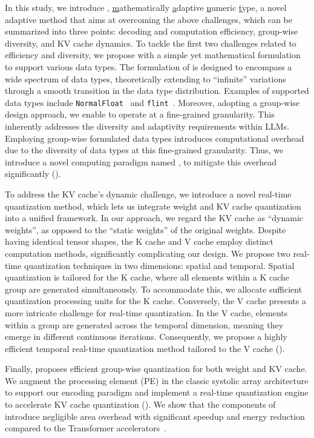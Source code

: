 In this study, we introduce \proj{}, \underline{m}athematically \underline{a}daptive \underline{n}umeric \underline{t}ype, a novel adaptive method that aims at overcoming the above challenges, which can be summarized into three points: decoding and computation efficiency, group-wise diversity, and KV cache dynamics.
To tackle the first two challenges related to efficiency and diversity, we propose \proj{} with a simple yet mathematical formulation to support various data types. 
The formulation of \proj{} is designed to encompass a wide spectrum of data types, theoretically extending to ``infinite'' variations through a smooth transition in the data type distribution. 
Examples of supported data types include \texttt{NormalFloat}~\cite{dettmers2023qlora} and \texttt{flint}~\cite{guo2022ant}.
Moreover, adopting a group-wise design approach, we enable \proj{} to operate at a fine-grained granularity.
This inherently addresses the diversity and adaptivity requirements within LLMs. 
Employing group-wise formulated data types introduces computational overhead due to the diversity of data types at this fine-grained granularity.
Thus, we introduce a novel computing paradigm named \proj, to mitigate this overhead significantly ().


To address the KV cache's dynamic challenge, we introduce a novel real-time quantization method, which lets us integrate weight and KV cache quantization into a unified framework.
In our approach, we regard the KV cache as ``dynamic weights'', as opposed to the ``static weights'' of the original weights.
Despite having identical tensor shapes, the K cache and V cache employ distinct computation methods, significantly complicating our design.
We propose two real-time quantization techniques in two dimensions: spatial and temporal. 
Spatial quantization is tailored for the K cache, where all elements within a K cache group are generated simultaneously. 
To accommodate this, we allocate sufficient quantization processing units for the K cache.
Conversely, the V cache presents a more intricate challenge for real-time quantization. In the V cache, elements within a group are generated across the temporal dimension, meaning they emerge in different continuous iterations. 
Consequently, we propose a highly efficient temporal real-time quantization method tailored to the V cache ().


Finally, \proj proposes efficient group-wise quantization for both weight and KV cache.
We augment the processing element (PE) in the classic systolic array architecture to support our encoding paradigm and implement a real-time quantization engine to accelerate KV cache quantization ().
We show that the components of \proj introduce negligible area overhead with significant speedup and energy reduction compared to the Transformer accelerators~\cite{guo2022ant,zadeh2022mokey,guo2023olive,lee2024tenderacceleratinglargelanguage}.


